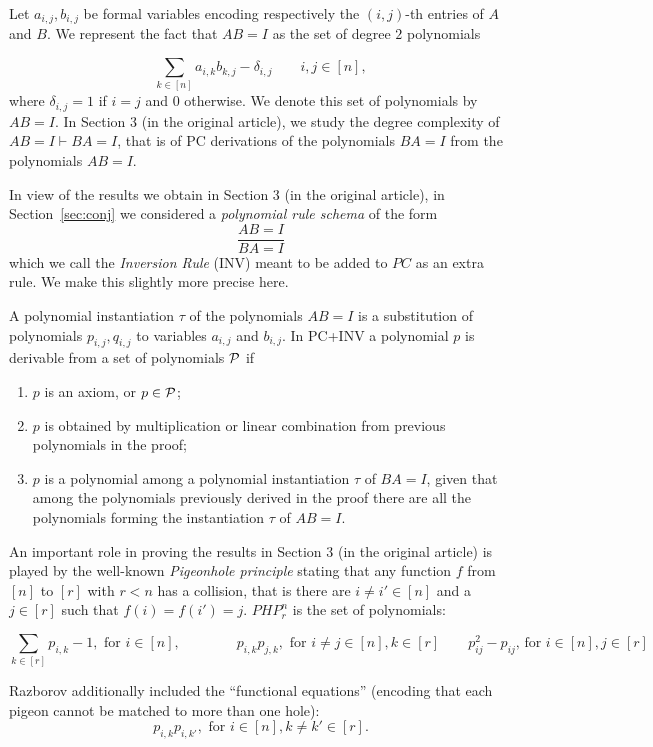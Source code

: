 Let $a_{i,j},b_{i,j}$ be formal variables 
 encoding respectively  the $(i,j)$-th entries of $A$ and $B$.  We represent the fact that $AB=I$ as the set of degree $2$ polynomials

$$
\sum_{k \in [n]} a_{i,k}b_{k,j} - \delta_{i,j}\qquad i,j \in [n],
$$
where $\delta_{i,j}=1$ if $i=j$ and $0$ otherwise. We denote this set of polynomials by $AB=I$. In Section 3 (in the original article), we study the degree complexity of  $AB=I \vdash BA=I$, that is of PC derivations of the polynomials $BA=I$ from the polynomials $AB=I$. 

\medskip

In view of the results we obtain in Section 3 (in the original article), in Section~\ref{sec:conj} we considered a  {\em polynomial rule schema} of the form 
$$
\frac{AB=I}{BA=I}
$$
which we call the {\em Inversion Rule} (INV) meant to be added to $PC$ as an extra rule. We make this slightly more precise here.

A polynomial instantiation $\tau$ of the polynomials $AB=I$ is a substitution of polynomials $p_{i,j},q_{i,j}$ to variables $a_{i,j}$ and $b_{i,j}$.   
In PC+INV a polynomial $p$ is derivable from a set of polynomials
${\cal P}$ if 
\begin{enumerate}
\item $p$ is an axiom, or $p \in {\cal P}$;
\item $p$ is obtained by multiplication or linear combination from previous polynomials in the proof;
\item $p$ is a polynomial among a polynomial instantiation $\tau$ of $BA=I$, given that among the polynomials previously derived  in the proof there are all the polynomials 
forming the instantiation $\tau$ of $AB=I$.
\end{enumerate}

\medskip

 An important role in proving the results in Section 3 (in the original article) is played by the well-known {\em Pigeonhole principle} stating that  any function $f$ from $[n]$ to $[r]$ with $r<n$ has a collision, that is there are $i \not= i' \in [n]$ and a $j\in[r]$ such that $f(i)=f(i')=j$. $PHP^n_r$ is the set of polynomials:

$$
\sum_{k\in [r]}p_{i,k} -1, \mbox{ for } i \in [n], \qquad \qquad p_{i,k}p_{j,k}, \mbox{ for } i \not= j \in [n], k \in [r] \qquad p_{ij}^2 - p_{ij} \text{, for $i \in [n], j \in [r]$} 
$$

Razborov \cite{DBLP:journals/cc/Razborov98} additionally included the ``functional equations'' (encoding that each pigeon cannot be matched to more than one hole):
\[
p_{i,k} p_{i,k'}, \mbox{ for } i \in [n], k \neq k' \in [r].
\]

\medskip




